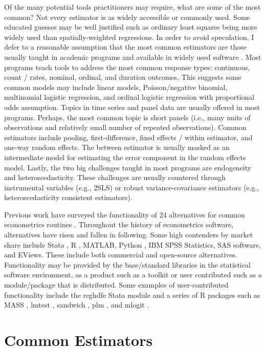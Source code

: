 \documentclass{juliacon}
\begin{document}
Of the many potential tools practitioners may require, what are some of the most common? Not every estimator is as widely accessible or commonly used. Some educated guesses may be well justified such as ordinary least squares being more widely used than spatially-weighted regressions. In order to avoid speculation, I defer to a reasonable assumption that the most common estimators are those usually taught in academic programs and available in widely used software \cite{Renfro_2009}. Most programs teach tools to address the most common response types: continuous, count / rates, nominal, ordinal, and duration outcomes. This suggests some common models may include linear models, Poisson/negative binomial, multinomial logistic regression, and ordinal logistic regression with proportional odds assumption. Topics in time series and panel data are usually offered in most programs. Perhaps, the most common topic is short panels (i.e., many units of observations and relatively small number of repeated observations). Common estimators include pooling, first-difference, fixed effects / within estimator, and one-way random effects. The between estimator is usually masked as an intermediate model for estimating the error component in the random effects model. Lastly, the two big challenges taught in most programs are endogeneity and heteroscedasticity. These challenges are usually countered through instrumental variables (e.g., 2SLS) or robust variance-covariance estimators (e.g., heteroscedasticity consistent estimators).

Previous work have surveyed the functionality of 24 alternatives for common econometrics routines \cite{Renfro_2009}. Throughout the history of econometrics software, alternatives have risen and fallen in following. Some high contenders by market share include Stata \cite{Stata}, R \cite{R}, MATLAB, Python \cite{Python}, IBM SPSS Statistics, SAS software, and EViews. These include both commercial and open-source alternatives. Functionality may be provided by the base/standard libraries in the statistical software environment, as a product such as a toolkit or user contributed such as a module/package that is distributed. Some examples of user-contributed functionality include the reghdfe Stata module and a series of R packages such as MASS \cite{MASS}, lmtest \cite{lmtest}, sandwich \cite{sandwich}, plm \cite{plm}, and mlogit \cite{mlogit}.

\section{Common Estimators}
\end{document}
